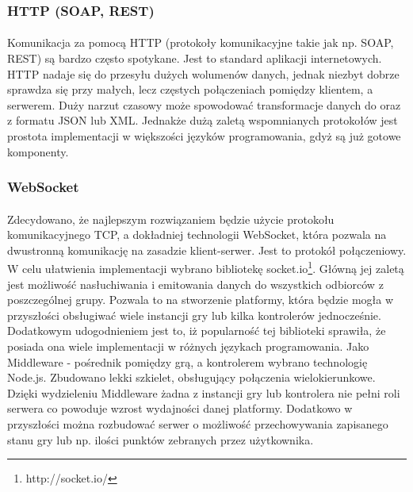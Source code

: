 \subsubsection{HTTP (SOAP, REST)}
\paragraph{}
Komunikacja za pomocą HTTP (protokoły komunikacyjne takie jak np. SOAP, REST) są bardzo często spotykane. Jest to standard aplikacji internetowych. HTTP nadaje się do przesyłu dużych wolumenów danych, jednak niezbyt dobrze sprawdza się przy małych, lecz częstych połączeniach pomiędzy klientem, a serwerem. Duży narzut czasowy może spowodować transformacje danych do oraz z formatu JSON lub XML. Jednakże dużą zaletą wspomnianych protokołów jest prostota implementacji w większości języków programowania, gdyż są już gotowe komponenty.
\subsubsection{WebSocket}
\paragraph{}
Zdecydowano, że najlepszym rozwiązaniem będzie użycie protokołu komunikacyjnego TCP, a dokładniej technologii WebSocket, która pozwala na dwustronną komunikację na zasadzie klient-serwer. Jest to protokół połączeniowy.
W celu ułatwienia implementacji wybrano bibliotekę socket.io\footnote{http://socket.io/}. Główną jej zaletą jest możliwość nasłuchiwania i emitowania danych do wszystkich odbiorców z poszczególnej grupy. Pozwala to na stworzenie platformy, która będzie mogła w przyszłości obsługiwać wiele instancji gry lub kilka kontrolerów jednocześnie. Dodatkowym udogodnieniem jest to, iż popularność tej biblioteki sprawiła, że posiada ona wiele implementacji w różnych językach programowania.
Jako Middleware - pośrednik pomiędzy grą, a kontrolerem wybrano technologię Node.js. Zbudowano lekki szkielet, obsługujący połączenia wielokierunkowe. Dzięki wydzieleniu Middleware żadna z instancji gry lub kontrolera nie pełni roli serwera co powoduje wzrost wydajności danej platformy. Dodatkowo w przyszłości można rozbudować serwer o możliwość przechowywania zapisanego stanu gry lub np. ilości punktów zebranych przez użytkownika.